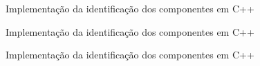 \begin{frame}[fragile]{Implementação da identificação dos componentes em C++}
\end{frame}

\begin{frame}[fragile]{Implementação da identificação dos componentes em C++}
\end{frame}

\begin{frame}[fragile]{Implementação da identificação dos componentes em C++}
\end{frame}
